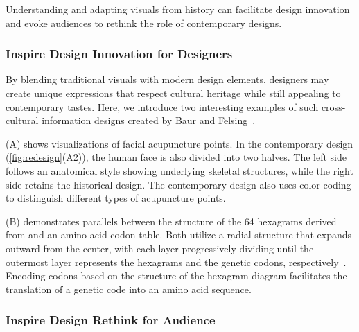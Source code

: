 Understanding and adapting visuals from history can facilitate design innovation and evoke audiences to rethink the role of contemporary designs.

\subsubsection{Inspire Design Innovation for Designers}
\label{sec:inspire-design-innovation}

By blending traditional visuals with modern design elements, designers may create unique expressions that respect cultural heritage while still appealing to contemporary tastes. 
Here, we introduce two interesting examples of such cross-cultural information designs created by Baur and Felsing~\cite{Baur2020Visual}.

(A) shows visualizations of facial acupuncture points.
In the contemporary design (\cref{fig:redesign}(A2)), the human face is also divided into two halves. 
The left side follows an anatomical style showing underlying skeletal structures, while the right side retains the historical design.
The contemporary design also uses color coding to distinguish different types of acupuncture points.

(B) demonstrates parallels between the structure of the 64 hexagrams derived from  and an amino acid codon table.
Both utilize a radial structure that expands outward from the center, with each layer progressively dividing until the outermost layer represents the hexagrams and the genetic codons, respectively~\cite{Baur2020Visual}.
Encoding codons based on the structure of the hexagram diagram facilitates the translation of a genetic code into an amino acid sequence.

\subsubsection{Inspire Design Rethink for Audience}

